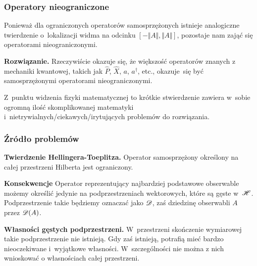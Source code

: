 \documentclass[10pt,t]{beamer}
\begin{document}
\begin{frame}
  \frametitle{Operatory nieograniczone}


  Ponieważ dla ograniczonych operatorów samosprzężonych istnieje analogiczne
  twierdzenie o~lokalizacji widma na odcinku $[ -\Vert A \Vert, \Vert A \Vert ]$,
  pozostaje nam zająć się operatorami nieograniczonymi.

  \textbf{Rozwiązanie.}
  Rzeczywiście okazuje się, że większość operatorów znanych z mechaniki
  kwantowej, takich jak $\widehat{ P }$, $\widehat{ X }$, $a$, $a^{ \dagger }$,
  etc., okazuje~się być samosprzężonymi operatorami nieograniczonymi.

  Z~punktu widzenia fizyki matematycznej to krótkie stwierdzenie zawiera
  w~sobie ogromną ilość skomplikowanej matematyki
  i~nietrywialnych/ciekawych/irytujących problemów do rozwiązania.

\end{frame}





\begin{frame}
  \frametitle{Źródło problemów}


  \textbf{Twierdzenie Hellingera-Toeplitza.}
  Operator samosprzężony określony na całej przestrzeni Hilberta jest
  ograniczony.

  \textbf{Konsekwencje}
  Operator reprezentujący najbardziej podstawowe obserwable możemy określić
  jedynie na podprzestrzeniach wektorowych, które są gęste w~$\mathcal{H}$.
  Podprzestrzenie takie będziemy oznaczać jako $\mathcal{D}$, zaś dziedzinę
  obserwabli $A$ przez $\mathcal{D}( A )$.

  \textbf{Własności gęstych podprzestrzeni.}
  W~przestrzeni skończenie wymiarowej takie podprzestrzenie nie istnieją.
  Gdy zaś istnieją, potrafią mieć bardzo nieoczekiwane i~wyjątkowe
  własności. W~szczególności nie można z nich wnioskować o własnościach
  całej przestrzeni.

\end{frame}
\end{document}
